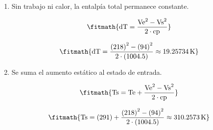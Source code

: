 \begin{enumerate}

\item Sin trabajo ni calor, la entalpía total permanece constante.

\[\fitmath{\mathrm{dT}=\frac{{\mathrm{Ve}}^{2}-{\mathrm{Vs}}^{2}}{2\cdot \mathrm{cp}}}\]

\[\fitmath{\mathrm{dT}=\frac{{(218)}^{2}-{(94)}^{2}}{2\cdot (1004.5)}\approx 19.25734\,\mathrm{K}}\]

\item Se suma el aumento estático al estado de entrada.

\[\fitmath{\mathrm{Ts}=\mathrm{Te}+\frac{{\mathrm{Ve}}^{2}-{\mathrm{Vs}}^{2}}{2\cdot \mathrm{cp}}}\]

\[\fitmath{\mathrm{Ts}=(291)+\frac{{(218)}^{2}-{(94)}^{2}}{2\cdot (1004.5)}\approx 310.2573\,\mathrm{K}}\]

\end{enumerate}
